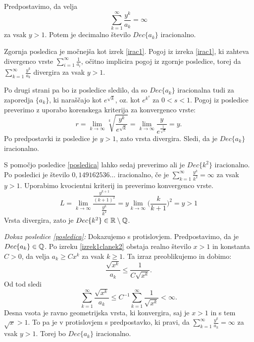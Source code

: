\documentclass[twoside,11pt]{article}
\begin{document}
\begin{posledica}
    \label{posledica}
    Predpostavimo, da velja
    \[
        \sum_{k=1}^{\infty}\frac{y^k}{a_k} = \infty\]
    za vsak $y > 1$. Potem je decimalno število $Dec\{a_k\}$ iracionalno.
\end{posledica}

Zgornja posledica je močnejša kot izrek \ref{irac1}. 
Pogoj iz izreka \ref{irac1}, ki zahteva divergenco vrste
$\sum_{i=1}^{\infty} \frac{1}{a_i}$, očitno implicira
pogoj iz zgornje posledice, torej da $\sum_{k=1}^{\infty}\frac{y^k}{a_k}$
divergira za vsak $y > 1$.

Po drugi strani pa bo iz posledice sledilo, da so $Dec\{a_k\}$ iracionalna tudi za zaporedja
$\{a_k\}$, ki naraščajo kot $e^{\sqrt{k}}$, oz. kot $e^{k^s}$ za $0 < s < 1$. 
Pogoj iz posledice preverimo z uporabo korenskega kriterija za konvergenco vrste:
\[
    r = \lim_{k \rightarrow \infty}\sqrt[k]{\frac{y^k}{e^{\sqrt{k}}}} = \lim_{k \rightarrow \infty}\frac{y}{e^{\frac{1}{\sqrt{k}}}}
    = y.
\]
Po predpostavki iz posledice je $y > 1$, zato vrsta divergira. 
Sledi, da je $Dec\{a_k\}$ iracionalno.
\\

\begin{zgled}
    S pomočjo posledice \ref{posledica} lahko sedaj preverimo ali je $Dec\{k^2\}$ iracionalno.
    Po posledici je število $0,149162536\dots$ iracionalno, če je $\sum_{k=1}^{\infty}\frac{y^k}{k^2} = \infty$
    za vsak $y > 1$. Uporabimo kvocientni kriterij in preverimo konvergenco vrste.
    \[
        L = \lim_{k \rightarrow \infty} \frac{\frac{y^{k+1}}{(k+1)^2}}{\frac{y^k}{k^2}}
        = y \lim_{k \rightarrow \infty} \big (\frac{k}{k + 1}\big)^2 = y > 1
    \]
    Vrsta divergira, zato je $Dec\{k^2\} \in \mathbb{R} \setminus \mathbb{Q}$.
\end{zgled}

\noindent
{\em Dokaz posledice \ref{posledica}:\/}
Dokazujemo s protislovjem. Predpostavimo, da je $Dec\{a_k\} \in \mathbb{Q}$.
Po izreku \ref{izrek1clanek2} obstaja realno število $x > 1$ in konstanta $C>0$, da velja
$a_k \geq Cx^k$ za vsak $k \geq 1$. Ta izraz preoblikujemo in dobimo:
\[
    \frac{\sqrt{x^k}}{a_k} \leq \frac{1}{C\sqrt{x^k}}.\] 
Od tod sledi
\[ \sum_{k=1}^{\infty} \frac{\sqrt{x^k}}{a_k} \leq C^{-1} \sum_{k=1}^{\infty} \frac{1}{\sqrt{x^k}} < \infty.\]
Desna vsota je ravno geometrijska vrsta, ki konvergira, saj je $x > 1$ in s tem $\sqrt{x} > 1$.
To pa je v protislovjem s predpostavko, ki pravi, da $\sum_{k=1}^{\infty}\frac{y^k}{a_k} = \infty$ za vsak $y>1$.
Torej bo $Dec\{a_k\}$ iracionalno.
\end{document}
